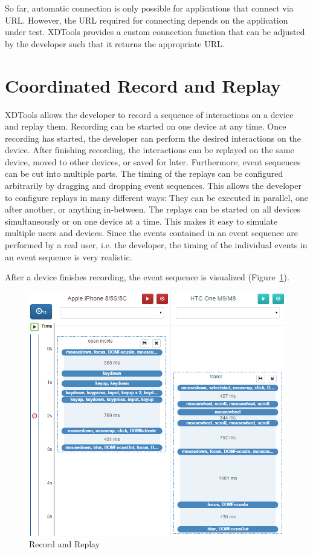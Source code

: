 So far, automatic connection is only possible for applications that connect via URL. However, the URL required for connecting depends on the application under test. XDTools provides a custom connection function that can be adjusted by the developer such that it returns the appropriate URL.

\section{Coordinated Record and Replay}

XDTools allows the developer to record a sequence of interactions on a device and replay them. Recording can be started on one device at any time. Once recording has started, the developer can perform the desired interactions on the device. After finishing recording, the interactions can be replayed on the same device, moved to other devices, or saved for later.  Furthermore, event sequences can be cut into multiple parts. The timing of the replays can be configured arbitrarily by dragging and dropping event sequences. This allows the developer to configure replays in many different ways: They can be executed in parallel, one after another, or anything in-between. The replays can be started on all devices simultaneously or on one device at a time. This makes it easy to simulate multiple users and devices. Since the events contained in an event sequence are performed by a real user, i.e. the developer, the timing of the individual events in an event sequence is very realistic.

After a device finishes recording, the event sequence is visualized (Figure~\ref{fig:record_replay}).

\begin{figure}[H]
  \centering
    \includegraphics[width=1.0\textwidth]{images/screenshots/record_replay_2.png}
	\caption[Screenshot: Record and replay]{Record and Replay}
	\label{fig:record_replay}
\end{figure}

